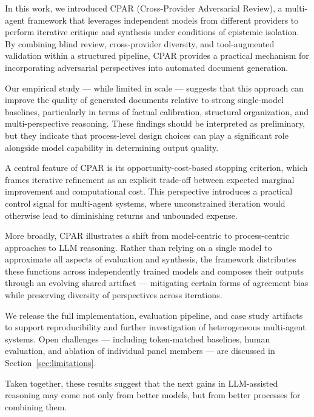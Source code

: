 \documentclass[11pt, a4paper]{article}
\begin{document}
In this work, we introduced CPAR (Cross-Provider Adversarial Review), a multi-agent framework that leverages independent models from different providers to perform iterative critique and synthesis under conditions of epistemic isolation. By combining blind review, cross-provider diversity, and tool-augmented validation within a structured pipeline, CPAR provides a practical mechanism for incorporating adversarial perspectives into automated document generation.

Our empirical study --- while limited in scale --- suggests that this approach can improve the quality of generated documents relative to strong single-model baselines, particularly in terms of factual calibration, structural organization, and multi-perspective reasoning. These findings should be interpreted as preliminary, but they indicate that process-level design choices can play a significant role alongside model capability in determining output quality.

A central feature of CPAR is its opportunity-cost-based stopping criterion, which frames iterative refinement as an explicit trade-off between expected marginal improvement and computational cost. This perspective introduces a practical control signal for multi-agent systems, where unconstrained iteration would otherwise lead to diminishing returns and unbounded expense.

More broadly, CPAR illustrates a shift from model-centric to process-centric approaches to LLM reasoning. Rather than relying on a single model to approximate all aspects of evaluation and synthesis, the framework distributes these functions across independently trained models and composes their outputs through an evolving shared artifact --- mitigating certain forms of agreement bias while preserving diversity of perspectives across iterations.

We release the full implementation, evaluation pipeline, and case study artifacts to support reproducibility and further investigation of heterogeneous multi-agent systems. Open challenges --- including token-matched baselines, human evaluation, and ablation of individual panel members --- are discussed in Section~\ref{sec:limitations}.

Taken together, these results suggest that the next gains in LLM-assisted reasoning may come not only from better models, but from better processes for combining them.



\end{document}
